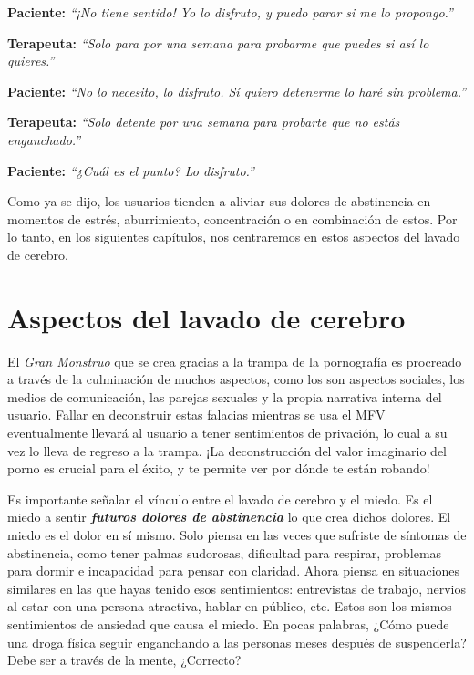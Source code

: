 \documentclass[
  spanish,
  openany]{book}
\begin{document}
\textbf{Paciente:} \emph{``¡No tiene sentido! Yo lo disfruto, y puedo parar si me lo propongo.''}

\textbf{Terapeuta:} \emph{``Solo para por una semana para probarme que puedes si así lo quieres.''}

\textbf{Paciente:} \emph{``No lo necesito, lo disfruto. Sí quiero detenerme lo haré sin problema.''}

\textbf{Terapeuta:} \emph{``Solo detente por una semana para probarte que no estás enganchado.''}

\textbf{Paciente:} \emph{``¿Cuál es el punto? Lo disfruto.''}

Como ya se dijo, los usuarios tienden a aliviar sus dolores de abstinencia en momentos de estrés, aburrimiento, concentración o en combinación de estos. Por lo tanto, en los siguientes capítulos, nos centraremos en estos aspectos del lavado de cerebro.

\hypertarget{aspectos-del-lavado-de-cerebro}{%
\chapter{Aspectos del lavado de cerebro}\label{aspectos-del-lavado-de-cerebro}}

El \emph{Gran Monstruo} que se crea gracias a la trampa de la pornografía es procreado a través de la culminación de muchos aspectos, como los son aspectos sociales, los medios de comunicación, las parejas sexuales y la propia narrativa interna del usuario. Fallar en deconstruir estas falacias mientras se usa el MFV eventualmente llevará al usuario a tener sentimientos de privación, lo cual a su vez lo lleva de regreso a la trampa. ¡La deconstrucción del valor imaginario del porno es crucial para el éxito, y te permite ver por dónde te están robando!

Es importante señalar el vínculo entre el lavado de cerebro y el miedo. Es el miedo a sentir \emph{\textbf{futuros dolores de abstinencia}} lo que crea dichos dolores. El miedo es el dolor en sí mismo. Solo piensa en las veces que sufriste de síntomas de abstinencia, como tener palmas sudorosas, dificultad para respirar, problemas para dormir e incapacidad para pensar con claridad. Ahora piensa en situaciones similares en las que hayas tenido esos sentimientos: entrevistas de trabajo, nervios al estar con una persona atractiva, hablar en público, etc. Estos son los mismos sentimientos de ansiedad que causa el miedo. En pocas palabras, ¿Cómo puede una droga física seguir enganchando a las personas meses después de suspenderla? Debe ser a través de la mente, ¿Correcto?
\end{document}
